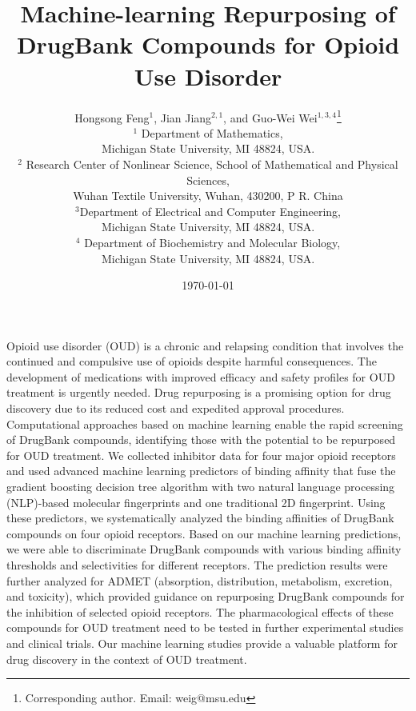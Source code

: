 \documentclass[10pt]{article}
\begin{document}
\title{Machine-learning Repurposing of DrugBank Compounds for Opioid Use Disorder  
}

\author{ Hongsong Feng$^1$, Jian Jiang$^{2,1}$, and Guo-Wei Wei$^{1,3,4}$\footnote{
		Corresponding author.		Email: weig@msu.edu} \\%
	$^1$ Department of Mathematics, \\
	Michigan State University, MI 48824, USA.\\
	$^2$ Research Center of Nonlinear Science, School of Mathematical and Physical Sciences,\\
	Wuhan Textile University, Wuhan, 430200, P R. China\\
	$^3$Department of Electrical and Computer Engineering,\\
	Michigan State University, MI 48824, USA. \\
	$^4$ Department of Biochemistry and Molecular Biology,\\
	Michigan State University, MI 48824, USA.  
}


\date{\today} 

\maketitle
	
	
Opioid use disorder (OUD) is a chronic and relapsing condition that involves the continued and compulsive use of opioids despite harmful consequences. The development of medications with improved efficacy and safety profiles for OUD treatment is urgently needed. Drug repurposing is a promising option for drug discovery due to its reduced cost and expedited approval procedures. Computational approaches based on machine learning enable the rapid screening of DrugBank compounds, identifying those with the potential to be repurposed for OUD treatment. We collected inhibitor data for four major opioid receptors and used advanced machine learning predictors of binding affinity that fuse the gradient boosting decision tree algorithm with two natural language processing (NLP)-based molecular fingerprints and one traditional 2D fingerprint. Using these predictors, we systematically analyzed the binding affinities of DrugBank compounds on four opioid receptors. Based on our machine learning predictions, we were able to discriminate DrugBank compounds with various binding affinity thresholds and selectivities for different receptors. The prediction results were further analyzed for ADMET (absorption, distribution, metabolism,  excretion, and toxicity), which provided guidance on repurposing DrugBank compounds for the inhibition of selected opioid receptors. The pharmacological effects of these compounds for OUD treatment need to be tested in further experimental studies and clinical trials. Our machine learning studies provide a valuable platform for drug discovery in the context of OUD treatment.
\end{document}
